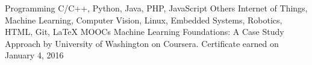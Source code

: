 \begin{cvskills}
  \cvskill
  	{Programming}
  	{C/C++, Python, Java, PHP, JavaScript}
   \cvskill
  	{Others}
  	{Internet of Things, Machine Learning, Computer Vision, Linux, Embedded Systems, Robotics, HTML, Git, LaTeX}
   \cvskill
    {MOOCs}
  	{Machine Learning Foundations: A Case Study Approach by University of Washington on Coursera. Certificate earned on January 4, 2016}
\end{cvskills}
